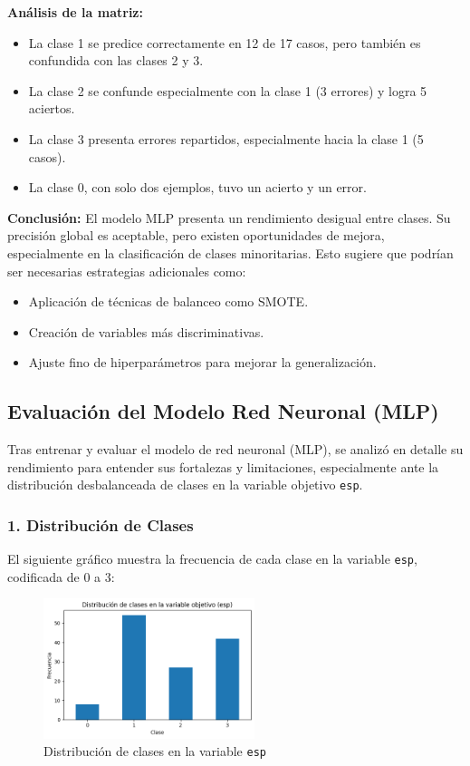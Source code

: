 \documentclass[11pt,a4paper]{article}
\begin{document}
\textbf{Análisis de la matriz:}
\begin{itemize}
    \item La clase 1 se predice correctamente en 12 de 17 casos, pero también es confundida con las clases 2 y 3.
    \item La clase 2 se confunde especialmente con la clase 1 (3 errores) y logra 5 aciertos.
    \item La clase 3 presenta errores repartidos, especialmente hacia la clase 1 (5 casos).
    \item La clase 0, con solo dos ejemplos, tuvo un acierto y un error.
\end{itemize}

\textbf{Conclusión:}  
El modelo MLP presenta un rendimiento desigual entre clases. Su precisión global es aceptable, pero existen oportunidades de mejora, especialmente en la clasificación de clases minoritarias. Esto sugiere que podrían ser necesarias estrategias adicionales como:
\begin{itemize}
    \item Aplicación de técnicas de balanceo como SMOTE.
    \item Creación de variables más discriminativas.
    \item Ajuste fino de hiperparámetros para mejorar la generalización.
\end{itemize}

\subsection{Evaluación del Modelo Red Neuronal (MLP)}

Tras entrenar y evaluar el modelo de red neuronal (MLP), se analizó en detalle su rendimiento para entender sus fortalezas y limitaciones, especialmente ante la distribución desbalanceada de clases en la variable objetivo \texttt{esp}.

\subsubsection*{1. Distribución de Clases}

El siguiente gráfico muestra la frecuencia de cada clase en la variable \texttt{esp}, codificada de 0 a 3:

\begin{figure}[H]
\centering
\includegraphics[width=0.55\textwidth]{img/distribucion_clases_esp.png}
\caption{Distribución de clases en la variable \texttt{esp}}
\end{figure}
\end{document}
